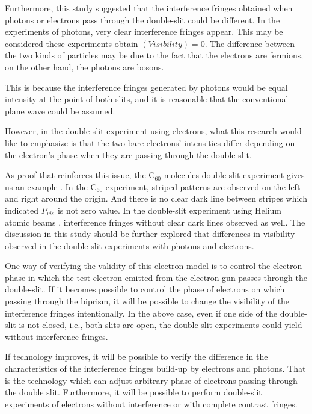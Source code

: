 \documentclass[%
 reprint,
 amsmath,amssymb,
 aps,
]{revtex4-1}
\numberwithin{equation}{section}%
\begin{document}
    Furthermore, this study suggested that the interference fringes obtained when photons or electrons pass through the double-slit could be different. In the experiments of photons, very clear interference fringes appear. This may be considered these experiments obtain $(Visibility) = 0$. The difference between the two kinds of particles may be due to the fact that the electrons are fermions, on the other hand, the photons are bosons.
    
    This is because the interference fringes generated by photons would be equal intensity at the point of both slits, and it is reasonable that the conventional plane wave could be assumed.
    
    However, in the double-slit experiment using electrons, what this research would like to emphasize is that the two bare electrons' intensities differ depending on the electron's phase when they are passing through the double-slit.
    
    As proof that reinforces this issue, the C$_\mathrm{60}$ molecules double slit experiment gives us an example \cite{Arndt}. In the C$_\mathrm{60}$ experiment, striped patterns are observed on the left and right around the origin. And there is no clear dark line between stripes which indicated $P_{vis}$ is not zero value. In the double-slit experiment using Helium atomic beams \cite{Carnal}, interference fringes without clear dark lines observed as well. The discussion in this study should be further explored that differences in visibility observed in the double-slit experiments with photons and electrons.
    
    One way of verifying the validity of this electron model is to  control the electron phase in which the test electron emitted from the electron gun passes through the double-slit. If it becomes possible to control the phase of electrons on which passing through the biprism, it will be possible to change the visibility of the interference fringes intentionally. In the above case, even if one side of the double-slit is not closed, i.e., both slits are open, the double slit experiments could yield without interference fringes.
    
    If technology improves, it will be possible to verify the difference in the characteristics of the interference fringes build-up by electrons and photons. That is the technology which can adjust arbitrary phase of electrons passing through the double slit. Furthermore, it will be possible to perform double-slit experiments of electrons without interference or with complete contrast fringes.
\end{document}
